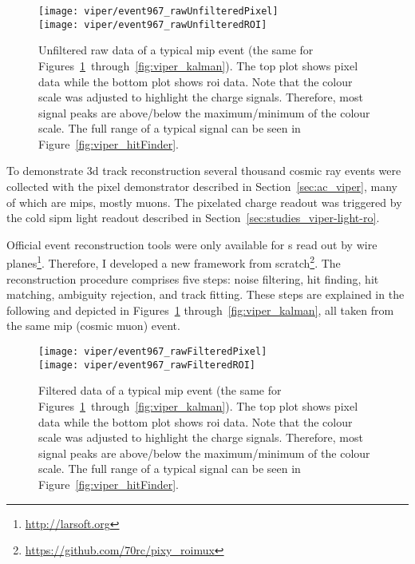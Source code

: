 
\begin{figure}[tbp]
	\centering
	\texttt{[image: viper/event967\_rawUnfilteredPixel]}\\
	\texttt{[image: viper/event967\_rawUnfilteredROI]}
	\caption[Unfiltered raw data of typical pixel demonstrator event]{%
		Unfiltered raw data of a typical \acrshort{mip} event (the same for Figures~\ref{fig:viper_unfilteredRawData}~through~\ref{fig:viper_kalman}).
		The top plot shows pixel data while the bottom plot shows \acrshort{roi} data.
		Note that the colour scale was adjusted to highlight the charge signals.
		Therefore, most signal peaks are above/below the maximum/minimum of the colour scale.
		The full range of a typical signal can be seen in Figure~\ref{fig:viper_hitFinder}.
	}
	\label{fig:viper_unfilteredRawData}
\end{figure}

To demonstrate \gls{3d} track reconstruction several thousand cosmic ray events were collected with the \AC{} pixel demonstrator described in Section~\ref{sec:ac_viper}, many of which are \glspl{mip}, mostly muons.
The pixelated charge readout was triggered by the cold \gls{sipm} light readout described in Section~\ref{sec:studies_viper-light-ro}.

Official event reconstruction tools were only available for \lartpc{}s read out by wire planes\footnote{\url{http://larsoft.org}}.
Therefore, I developed a new framework from scratch\footnote{\url{https://github.com/70rc/pixy_roimux}}.
The reconstruction procedure comprises five steps: noise filtering, hit finding, hit matching, ambiguity rejection, and track fitting.
These steps are explained in the following and depicted in Figures~\ref{fig:viper_unfilteredRawData} through~\ref{fig:viper_kalman}, all taken from the same \gls{mip} (cosmic muon) event.

\begin{figure}[tbp]
	\centering
	\texttt{[image: viper/event967\_rawFilteredPixel]}\\
	\texttt{[image: viper/event967\_rawFilteredROI]}
	\caption[Filtered data of typical pixel demonstrator event]{%
		Filtered data of a typical \acrshort{mip} event (the same for Figures~\ref{fig:viper_unfilteredRawData}~through~\ref{fig:viper_kalman}).
		The top plot shows pixel data while the bottom plot shows \acrshort{roi} data.
		Note that the colour scale was adjusted to highlight the charge signals.
		Therefore, most signal peaks are above/below the maximum/minimum of the colour scale.
		The full range of a typical signal can be seen in Figure~\ref{fig:viper_hitFinder}.
	}
	\label{fig:viper_filteredRawData}
\end{figure}

